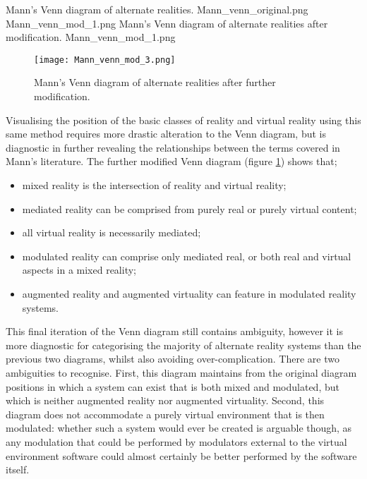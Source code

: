  {Mann's Venn diagram of alternate realities.} {Mann_venn_original.png}
       {Mann_venn_mod_1.png} {Mann's Venn diagram of alternate realities after modification.} {Mann_venn_mod_1.png}

\begin{figure}[h]
\centering
  \texttt{[image: Mann\_venn\_mod\_3.png]}
  \caption{Mann's Venn diagram of alternate realities after further modification.}
  \label{Mann_venn_mod_3.png}
\end{figure}

Visualising the position of the basic classes of reality and virtual reality using this same method requires more drastic alteration to the Venn diagram, but is diagnostic in further revealing the relationships between the terms covered in Mann's literature. The further modified Venn diagram (figure \ref{Mann_venn_mod_3.png}) shows that;
\begin{itemize}
	\item mixed reality is the intersection of reality and virtual reality;
	\item mediated reality can be comprised from purely real or purely virtual content;
	\item all virtual reality is necessarily mediated;
	\item modulated reality can comprise only mediated real, or both real and virtual aspects in a mixed reality;
	\item augmented reality and augmented virtuality can feature in modulated reality systems.
\end{itemize}

This final iteration of the Venn diagram still contains ambiguity, however it is more diagnostic for categorising the majority of alternate reality systems than the previous two diagrams, whilst also avoiding over-complication. There are two ambiguities to recognise. First, this diagram maintains from the original diagram positions in which a system can exist that is both mixed and modulated, but which is neither augmented reality nor augmented virtuality. Second, this diagram does not accommodate a purely virtual environment that is then modulated: whether such a system would ever be created is arguable though, as any modulation that could be performed by modulators external to the virtual environment software could almost certainly be better performed by the software itself.


